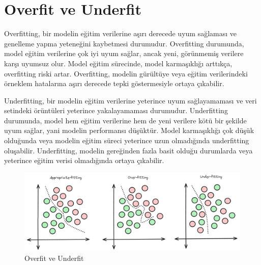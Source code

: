 \section{Overfit ve Underfit}
Overfitting, bir modelin eğitim verilerine aşırı derecede uyum sağlaması ve genelleme yapma yeteneğini kaybetmesi durumudur. Overfitting durumunda, model eğitim verilerine çok iyi uyum sağlar, ancak yeni, görünmemiş verilere karşı uyumsuz olur. Model eğitim sürecinde, model karmaşıklığı arttıkça, overfitting riski artar.  Overfitting, modelin gürültüye veya eğitim verilerindeki örneklem hatalarına aşırı derecede tepki göstermesiyle ortaya çıkabilir.

Underfitting, bir modelin eğitim verilerine yeterince uyum sağlayamaması ve veri setindeki örüntüleri yeterince yakalayamaması durumudur. Underfitting durumunda, model hem eğitim verilerine hem de yeni verilere kötü bir şekilde uyum sağlar, yani modelin performansı düşüktür.  Model karmaşıklığı çok düşük olduğunda veya modelin eğitim süreci yeterince uzun olmadığında underfitting oluşabilir.  Underfitting, modelin gereğinden fazla basit olduğu durumlarda veya yeterince eğitim verisi olmadığında ortaya çıkabilir.

\begin{figure}[h]
    \centering
    \includegraphics[width=1\textwidth]{images/overfit_vs_underfit.png}
    \caption{Overfit ve Underfit}
    \label{fig:enter-label}
\end{figure}

\newpage